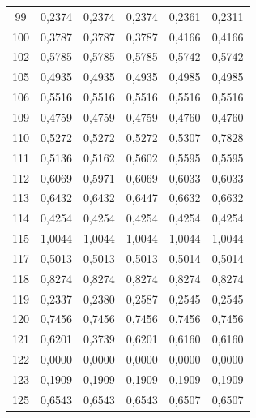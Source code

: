 \begin{center}
\begin{longtable}{c|r|r|r|r|r}
99 & 0,2374 & 0,2374 & 0,2374 & 0,2361 & 0,2311 \\

100 & 0,3787 & 0,3787 & 0,3787 & 0,4166 & 0,4166 \\

102 & 0,5785 & 0,5785 & 0,5785 & 0,5742 & 0,5742 \\

105 & 0,4935 & 0,4935 & 0,4935 & 0,4985 & 0,4985 \\

106 & 0,5516 & 0,5516 & 0,5516 & 0,5516 & 0,5516 \\

109 & 0,4759 & 0,4759 & 0,4759 & 0,4760 & 0,4760 \\

110 & 0,5272 & 0,5272 & 0,5272 & 0,5307 & 0,7828 \\

111 & 0,5136 & 0,5162 & 0,5602 & 0,5595 & 0,5595 \\

112 & 0,6069 & 0,5971 & 0,6069 & 0,6033 & 0,6033 \\

113 & 0,6432 & 0,6432 & 0,6447 & 0,6632 & 0,6632 \\

114 & 0,4254 & 0,4254 & 0,4254 & 0,4254 & 0,4254 \\

115 & 1,0044 & 1,0044 & 1,0044 & 1,0044 & 1,0044 \\

117 & 0,5013 & 0,5013 & 0,5013 & 0,5014 & 0,5014 \\

118 & 0,8274 & 0,8274 & 0,8274 & 0,8274 & 0,8274 \\

119 & 0,2337 & 0,2380 & 0,2587 & 0,2545 & 0,2545 \\

120 & 0,7456 & 0,7456 & 0,7456 & 0,7456 & 0,7456 \\

121 & 0,6201 & 0,3739 & 0,6201 & 0,6160 & 0,6160 \\

122 & 0,0000 & 0,0000 & 0,0000 & 0,0000 & 0,0000 \\

123 & 0,1909 & 0,1909 & 0,1909 & 0,1909 & 0,1909 \\

125 & 0,6543 & 0,6543 & 0,6543 & 0,6507 & 0,6507 \\


\end{longtable}
\end{center}
